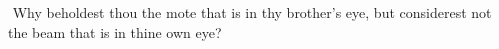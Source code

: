 \documentclass[MAIN]{subfiles}
\begin{document}
$ ${\color{red} Why beholdest thou the mote that is in thy brother's eye, but considerest not the beam that is in thine own eye?}
\end{document}
